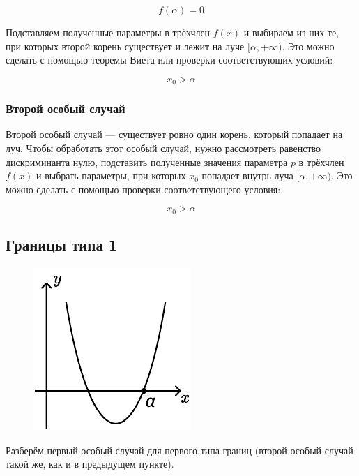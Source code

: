 \begin {equation*}
    f(\alpha) = 0
\end {equation*}

Подставляем полученные параметры в трёхчлен $f(x)$ и выбираем из них те, при которых второй корень
существует и лежит на луче $[\alpha, +\infty)$.  Это можно
сделать с помощью теоремы Виета или проверки соответствующих условий:

\begin {equation*}
    x_0 > \alpha
\end {equation*}

\subsubsection {Второй особый случай}

Второй особый случай --- существует ровно один корень, который попадает на луч. Чтобы обработать
этот особый случай, нужно рассмотреть равенство дискриминанта нулю, подставить полученные значения
параметра $p$ в трёхчлен $f(x)$ и выбрать параметры, при которых $x_0$ попадает внутрь луча
$[\alpha, +\infty)$. Это можно сделать с помощью проверки соответствующего условия:

\begin {equation*}
    x_0 > \alpha
\end {equation*}

\subsection {Границы типа 1}

\begin {figure}[h]
    \begin {minipage} [t] {\linewidth}
        \centering
        \includegraphics [width=0.3\linewidth] {images/image_19.pdf}
    \end {minipage}
\end {figure}

Разберём первый особый случай для первого типа границ (второй особый случай такой же, как и в
предыдущем пункте).

